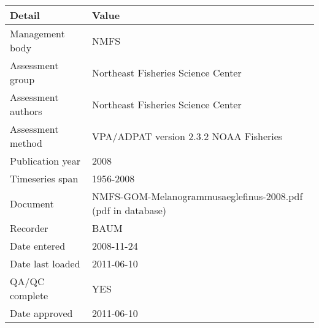 \begin{table}[htb]
\centering
\begin{tabular}{lp{7cm}}
\toprule
Detail & Value \\
\midrule
Management body    & NMFS                                                        \\
Assessment group   & Northeast Fisheries Science Center                          \\
Assessment authors & Northeast Fisheries Science Center                          \\
Assessment method  & VPA/ADPAT version 2.3.2 NOAA Fisheries                      \\
Publication year   & 2008                                                        \\
Timeseries span    & 1956-2008                                                   \\
Document           & NMFS-GOM-Melanogrammusaeglefinus-2008.pdf (pdf in database) \\
Recorder           & BAUM                                                        \\
Date entered       & 2008-11-24                                                  \\
Date last loaded   & 2011-06-10                                                  \\
QA/QC complete     & YES                                                         \\
Date approved      & 2011-06-10                                                  \\
\bottomrule
\end{tabular}
\label{tab:assessdet}
\end{table}

